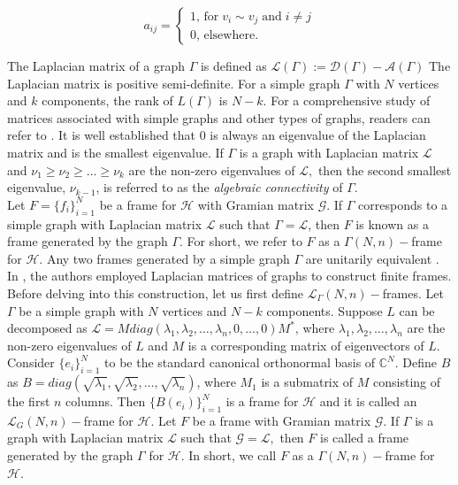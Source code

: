 \documentclass[final,1p,times]{elsarticle}
\begin{document}
$$  	a_{ij} = \begin{cases}
	1,\, \text{for}\; v_i \sim v_j \;\text{and}\; i \neq j \\
	0,\,\text{elsewhere}	.
\end{cases}  $$$$
 $$

The Laplacian matrix of a graph $\Gamma$ is defined as $\mathcal{L}(\Gamma):=\mathcal{D}(\Gamma)-\mathcal{A}(\Gamma)$ The Laplacian matrix is positive semi-definite. For a simple graph $\Gamma$ with $N$ vertices and $k$ components, the rank of $L(\Gamma)$ is $N-k.$ For a comprehensive study of matrices associated with simple graphs and other types of graphs, readers can refer to \cite{bapat}. It is well established that $0$ is always an eigenvalue of the Laplacian matrix and is the smallest eigenvalue. If $\Gamma$ is a graph with Laplacian matrix $\mathcal{L}$ and $\nu_1 \geq \nu_2\geq \ldots \geq\nu_k$ are the non-zero eigenvalues of $\mathcal{L},$ then the second smallest eigenvalue, $\nu_{k-1}$, is referred to as the \textit{algebraic connectivity} of $\Gamma.$ \\
Let $F= \{f_i\}_{i=1}^N$ be a frame for $\mathcal{H}$ with Gramian matrix $\mathcal{G}.$ If $\Gamma$ corresponds to a simple graph with Laplacian matrix $\mathcal{L}$ such that $\Gamma=\mathcal{L}$, then $F$ is known as a frame generated by the graph $\Gamma.$ For short, we refer to $F$ as a $\Gamma(N,n)-$frame for $\mathcal{H}.$ Any two frames generated by a simple graph $\Gamma$ are unitarily equivalent \cite{deep1}.
 In \cite{deep2}, the authors employed Laplacian matrices of graphs to construct finite frames. Before delving into this construction, let us first define $\mathcal{L}_\Gamma(N,n)-$frames. Let $\Gamma$ be a simple graph with $N$ vertices and $N-k$ components. Suppose $L$ can be decomposed as $\mathcal{L}= M \textit{diag}(\lambda_1, \lambda_2, \ldots,\lambda_n, 0,\ldots,0)M^*,\,$where $\lambda_1,\lambda_2, \ldots,\lambda_n$ are the non-zero eigenvalues of $L$ and $M$ is a corresponding matrix of eigenvectors of $L.$ Consider $\{e_i\}_{i=1}^N$ to be the standard canonical orthonormal basis of $\mathbb{C}^N$. Define $B$ as $B= \textit{diag}\left(\sqrt{\lambda_1}, \sqrt{\lambda_2}, \ldots,\sqrt{\lambda_n}\right)$, where $M_1$ is a submatrix of $M$ consisting of the first $n$ columns. Then $\{B(e_i)\}_{i=1}^N$ is a frame for $\mathcal{H}$ and it is called an $\mathcal{L}_G(N,n)-$frame for $\mathcal{H}$\cite{deep1}. Let $F$ be a frame with Gramian matrix $\mathcal{G}.$ If $\Gamma$ is a graph with Laplacian matrix $\mathcal{L}$ such that $ \mathcal{G}= \mathcal{L},$ then $F$ is called a frame generated by the
 graph $\Gamma$ for $\mathcal{H}.$ In short, we call $F$ as a $\Gamma(N,n)-$frame for $\mathcal{H}.$
\end{document}
